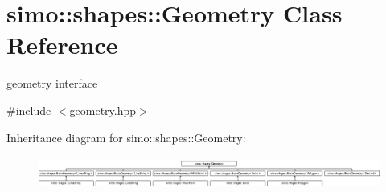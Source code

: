 \hypertarget{classsimo_1_1shapes_1_1_geometry}{\section{simo\-:\-:shapes\-:\-:Geometry Class Reference}
\label{classsimo_1_1shapes_1_1_geometry}
}


geometry interface  




{\ttfamily \#include $<$geometry.\-hpp$>$}

Inheritance diagram for simo\-:\-:shapes\-:\-:Geometry\-:\begin{figure}[H]
\begin{center}
\leavevmode
\includegraphics[height=1.048689cm]{classsimo_1_1shapes_1_1_geometry}
\end{center}
\end{figure}
